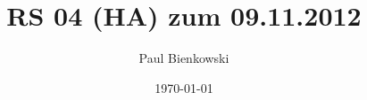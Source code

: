 \documentclass[a4paper,10pt]{scrartcl}
\author{Paul Bienkowski}
\title{RS 04 (HA) zum 09.11.2012}
\date{\today}
\begin{document}
\setcounter{secnumdepth}{0}
\maketitle

\newlength{\digitwidth}
\newcommand\wmrule[2]{\noalign{\moveright#1\digitwidth\vbox{\hrule width#2\digitwidth\vspace{1pt}}}}
\newenvironment{wmcalc}
  {\vspace{0.6em}\begin{center}\settowidth\digitwidth{0}\setlength{\tabcolsep}{\digitwidth}\def~{\hspace{\digitwidth}}\begin{tabular}{r@{}}}
  {\end{tabular}\end{center}\vspace{0.6em}}
\end{document}
